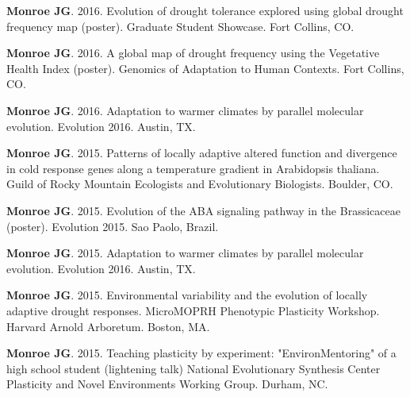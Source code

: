 \documentclass[12pt,english]{article}
\begin{document}
\begin{hangparas}{.5in}{1}

\hspace{1em}\textbf{Monroe JG}. 2016. Evolution of drought tolerance explored using global drought frequency map (poster). Graduate Student Showcase. Fort Collins, CO.
\vspace{0.5ex}\par
\hspace{1em}\textbf{Monroe JG}. 2016. A global map of drought frequency using the Vegetative Health Index (poster). Genomics of Adaptation to Human Contexts. Fort Collins, CO.
\vspace{0.5ex}\par
\hspace{1em}\textbf{Monroe JG}. 2016. Adaptation to warmer climates by parallel molecular evolution. Evolution 2016. Austin, TX.
\vspace{0.5ex}\par
\hspace{1em}\textbf{Monroe JG}. 2015. Patterns of locally adaptive altered function and divergence in cold response genes along a temperature gradient in Arabidopsis thaliana. Guild of Rocky Mountain Ecologists and Evolutionary Biologists. Boulder, CO.
\vspace{0.5ex}\par
\hspace{1em}\textbf{Monroe JG}. 2015. Evolution of the ABA signaling pathway in the Brassicaceae (poster). Evolution 2015. Sao Paolo, Brazil.
\vspace{0.5ex}\par
\hspace{1em}\textbf{Monroe JG}. 2015. Adaptation to warmer climates by parallel molecular evolution. Evolution 2016. Austin, TX.
\vspace{0.5ex}\par
\hspace{1em}\textbf{Monroe JG}. 2015. Environmental variability and the evolution of locally adaptive drought responses. MicroMOPRH Phenotypic Plasticity Workshop. Harvard Arnold Arboretum. Boston, MA.
\vspace{0.5ex}\par
\hspace{1em}\textbf{Monroe JG}. 2015. Teaching plasticity by experiment: "EnvironMentoring" of a high school student (lightening talk) National Evolutionary Synthesis Center Plasticity and Novel Environments Working Group. Durham, NC.
\vspace{0.5ex}\par
\end{hangparas}
\end{document}
